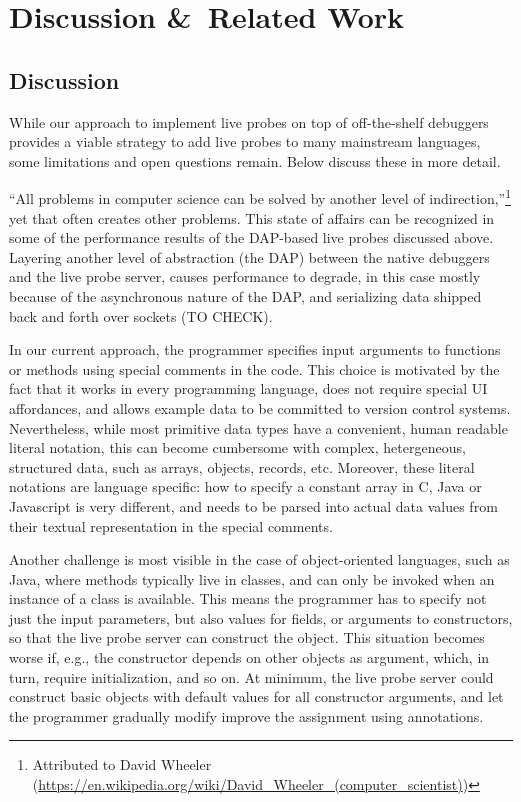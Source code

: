 \documentclass[english,submission]{programming}
\begin{document}
\section{Discussion \&\ Related Work}
\label{sec:related-work}

\subsection{Discussion}

While our approach to implement live probes on top of off-the-shelf debuggers provides a viable strategy to add live probes to many mainstream languages, some limitations and open questions remain. Below discuss these in more detail.

``All problems in computer science can be solved by another level of indirection,''\footnote{Attributed to David Wheeler (\url{https://en.wikipedia.org/wiki/David_Wheeler_(computer_scientist)})} yet that often creates other problems. This state of affairs can be recognized in some of the performance results of the DAP-based live probes discussed above. Layering another level of abstraction (the DAP) between the native debuggers and the live probe server, causes performance to degrade, in this case mostly because of the asynchronous nature of the DAP, and serializing data shipped back and forth over sockets (TO CHECK). 


In our current approach, the programmer specifies input arguments to functions or methods using special comments in the code. This choice is motivated by the fact that it works in every programming language, does not require special UI affordances, and allows example data to be committed to version control systems. Nevertheless, while most primitive data types have a convenient, human readable literal notation, this can become cumbersome with complex, hetergeneous, structured data, such as arrays, objects, records, etc.  Moreover, these literal notations are language specific: how to specify a constant array in C, Java or Javascript is very different, and needs to be parsed into actual data values from their textual representation in the special comments. 

Another challenge is most visible in the case of object-oriented languages, such as Java, where methods typically live in classes, and can only be invoked when an instance of a class is available. This means the programmer has to specify not just the input parameters, but also values for fields, or arguments to constructors, so that the live probe server can construct the object. This situation becomes worse if, e.g., the constructor depends on other objects as argument, which, in turn, require initialization, and so on. At minimum, the live probe server could construct basic objects with default values for all constructor arguments, and let the programmer gradually modify improve the assignment using annotations. 
\end{document}
